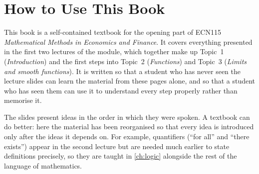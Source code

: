 \chapter{How to Use This Book}

This book is a self-contained textbook for the opening part of ECN115
\emph{Mathematical Methods in Economics and Finance}. It covers everything presented in the first two
lectures of the module, which together make up Topic~1 (\emph{Introduction}) and the first steps into
Topic~2 (\emph{Functions}) and Topic~3 (\emph{Limits and smooth functions}). It is written so that a
student who has never seen the lecture slides can learn the material from these pages alone, and so that
a student who has seen them can use it to understand every step properly rather than memorise it.

The slides present ideas in the order in which they were spoken. A textbook can do better: here the
material has been reorganised so that every idea is introduced only after the ideas it depends on. For
example, quantifiers (``for all'' and ``there exists'') appear in the second lecture but are needed
much earlier to state definitions precisely, so they are taught in \cref{ch:logic} alongside the rest
of the language of mathematics.

